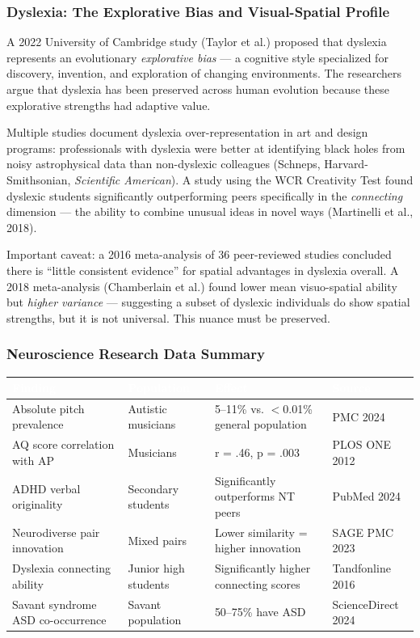 \documentclass[11pt,letterpaper]{article}
\newcommand{\tableheader}[1]{\textbf{\sffamily\textcolor{white}{#1}}}
\begin{document}
\subsubsection{Dyslexia: The Explorative Bias and Visual-Spatial Profile}

A 2022 University of Cambridge study (Taylor et al.) proposed that dyslexia represents an evolutionary \textit{explorative bias} --- a cognitive style specialized for discovery, invention, and exploration of changing environments. The researchers argue that dyslexia has been preserved across human evolution because these explorative strengths had adaptive value.

Multiple studies document dyslexia over-representation in art and design programs: professionals with dyslexia were better at identifying black holes from noisy astrophysical data than non-dyslexic colleagues (Schneps, Harvard-Smithsonian, \textit{Scientific American}). A study using the WCR Creativity Test found dyslexic students significantly outperforming peers specifically in the \textit{connecting} dimension --- the ability to combine unusual ideas in novel ways (Martinelli et al., 2018).

Important caveat: a 2016 meta-analysis of 36 peer-reviewed studies concluded there is ``little consistent evidence'' for spatial advantages in dyslexia overall. A 2018 meta-analysis (Chamberlain et al.) found lower mean visuo-spatial ability but \textit{higher variance} --- suggesting a subset of dyslexic individuals do show spatial strengths, but it is not universal. This nuance must be preserved.

\subsubsection{Neuroscience Research Data Summary}

\begin{center}
\begin{tabularx}{\textwidth}{L{3.5cm}L{3.5cm}XC{2cm}}
\toprule
{}
\tableheader{Finding} & \tableheader{Population} & \tableheader{Effect} & \tableheader{Source} \\
\midrule
Absolute pitch prevalence & Autistic musicians & 5--11\% vs. $<$0.01\% general population & PMC 2024 \\
AQ score correlation with AP & Musicians & r = .46, p = .003 & PLOS ONE 2012 \\
ADHD verbal originality & Secondary students & Significantly outperforms NT peers & PubMed 2024 \\
Neurodiverse pair innovation & Mixed pairs & Lower similarity = higher innovation & SAGE PMC 2023 \\
Dyslexia connecting ability & Junior high students & Significantly higher connecting scores & Tandfonline 2016 \\
Savant syndrome ASD co-occurrence & Savant population & 50--75\% have ASD & ScienceDirect 2024 \\
\bottomrule
\end{tabularx}
\end{center}
\end{document}
